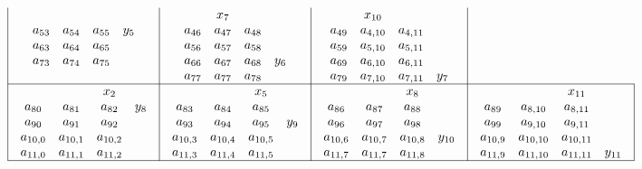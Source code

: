 \documentclass[headnav]{beamer}
\begin{document}
{{\[\begin{array}{| c | c | c | c |}
\begin{array}{c c c c}
a_{53} & a_{54} &a_{55} & y_5\\
a_{63} & a_{64} &a_{65} & \\
a_{73} & a_{74} &a_{75} & \\
\end{array}
&
\begin{array}{c c c c}
& x_7\\
a_{46} & a_{47} &a_{48} & \\
a_{56} & a_{57} &a_{58} & \\
a_{66} & a_{67} &a_{68} & y_6 \\
a_{77} & a_{77} &a_{78} & \\
\end{array}
&
\begin{array}{c c c c}
& x_{10}\\
a_{49} & a_{4,10} & a_{4,11} & \\
a_{59} & a_{5,10} & a_{5,11} & \\
a_{69} & a_{6,10} & a_{6,11} & \\
a_{79} & a_{7,10} & a_{7,11} & y_7 \\
\end{array}
\\ \hline
\begin{array}{c c c c}
&&x_2\\
a_{80} &  a_{81} &  a_{82} & y_8\\
a_{90} &  a_{91}   &a_{92} & \\
a_{10,0} &a_{10,1} &a_{10,2} & \\
a_{11,0} &a_{11,1} &a_{11,2} & \\
\end{array}
&
\begin{array}{c c c c}
&&x_5\\
a_{83} &   a_{84} &  a_{85} & \\
a_{93} &   a_{94} &  a_{95} & y_9\\
a_{10,3} & a_{10,4} &a_{10,5} & \\
a_{11,3} & a_{11,4} &a_{11,5} & \\
\end{array}
&
\begin{array}{c c c c}
&&x_8\\
a_{86} &   a_{87} &  a_{88} & \\
a_{96} &   a_{97} &  a_{98} & \\
a_{10,6} & a_{10,7} &a_{10,8} & y_{10} \\
a_{11,7} & a_{11,7} &a_{11,8} & \\
\end{array}
&
\begin{array}{c c c c}
&&x_{11}\\
a_{89} &   a_{8,10} &  a_{8,11} & \\
a_{99} &   a_{9,10} &  a_{9,11} & \\
a_{10,9} & a_{10,10} & a_{10,11} & \\
a_{11,9} & a_{11,10} & a_{11,11} & y_{11} \\
\end{array}
\\ \hline
\end{array}
\]
}
}
\end{document}
